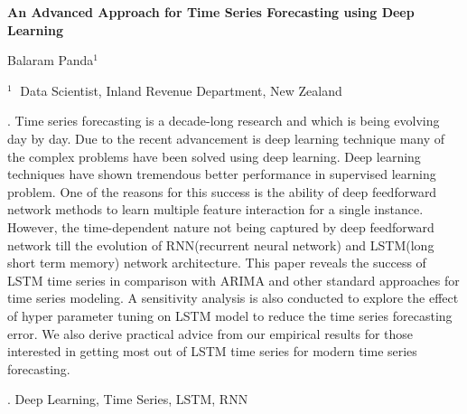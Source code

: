 \documentclass[12pt]{article}
\begin{document}
\begin{flushleft}


{\LARGE\bf An Advanced Approach for Time Series Forecasting using Deep Learning}


\vspace{1.0cm}

Balaram Panda$^1$

\begin{description}

\item $^1 \;$ Data Scientist, Inland Revenue Department, New Zealand

\end{description}

\end{flushleft}


\vspace{0.75cm}

. Time series forecasting is a decade-long research and which is being evolving day by day. Due to the recent advancement is deep learning technique many of the complex problems have been solved using deep learning. Deep learning techniques have shown tremendous better performance in supervised learning problem. One of the reasons for this success is the ability of deep feedforward network methods to learn multiple feature interaction for a single instance. However, the time-dependent nature not being captured by deep feedforward network till the evolution of RNN(recurrent neural network) and LSTM(long short term memory) network architecture. This paper reveals the success of LSTM time series in comparison with ARIMA and other standard approaches for time series modeling. A sensitivity analysis is also conducted to explore the effect of hyper parameter tuning on LSTM model to reduce the time series forecasting error.  We also derive practical advice from our empirical results for those interested in getting most out of LSTM time series for modern time series forecasting.

\vskip 2mm

.
Deep Learning, Time Series, LSTM, RNN
\end{document}
